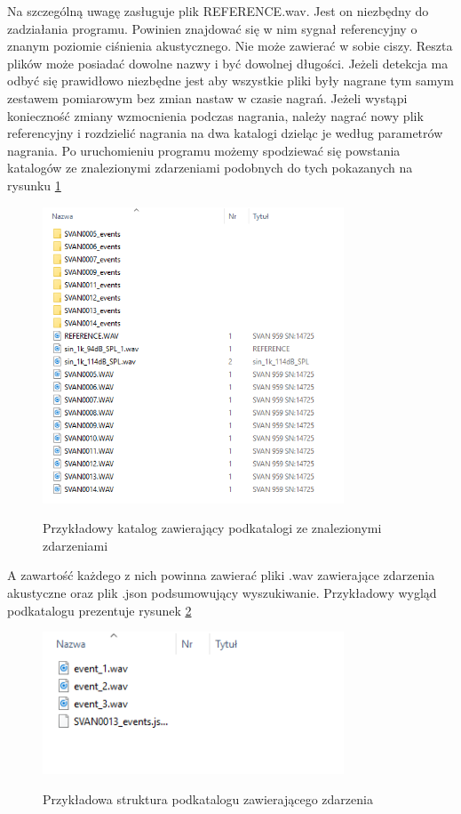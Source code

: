 \documentclass[eng,printmode]{mgr}
\begin{document}
Na szczególną uwagę zasługuje plik REFERENCE.wav. Jest on niezbędny do zadziałania programu. Powinien znajdować się w nim sygnał referencyjny o znanym poziomie ciśnienia akustycznego. Nie może zawierać w sobie ciszy. Reszta plików może posiadać dowolne nazwy i być dowolnej długości. Jeżeli detekcja ma odbyć się prawidłowo niezbędne jest aby wszystkie pliki były nagrane tym samym zestawem pomiarowym bez zmian nastaw w czasie nagrań. Jeżeli wystąpi konieczność zmiany wzmocnienia podczas nagrania, należy nagrać nowy plik referencyjny i rozdzielić nagrania na dwa katalogi dzieląc je według parametrów nagrania. Po uruchomieniu programu możemy spodziewać się powstania katalogów ze znalezionymi zdarzeniami podobnych do tych pokazanych na rysunku \ref{wydarzenia}

\begin{figure}[hbtp]
\caption{Przykładowy katalog zawierający podkatalogi ze znalezionymi zdarzeniami}
\centering
\includegraphics[width=0.8\textwidth]{katalog__eventy_przyklad.PNG}
\label{wydarzenia} 
\end{figure}

A zawartość każdego z nich powinna zawierać pliki .wav zawierające zdarzenia akustyczne oraz plik .json podsumowujący wyszukiwanie. Przykładowy wygląd podkatalogu prezentuje rysunek \ref{podkatalog}

\begin{figure}[hbtp]
\caption{Przykładowa struktura podkatalogu zawierającego zdarzenia }
\centering
\includegraphics[width=0.8\textwidth]{podkatalog.PNG}
\label{podkatalog}
\end{figure}
\end{document}
